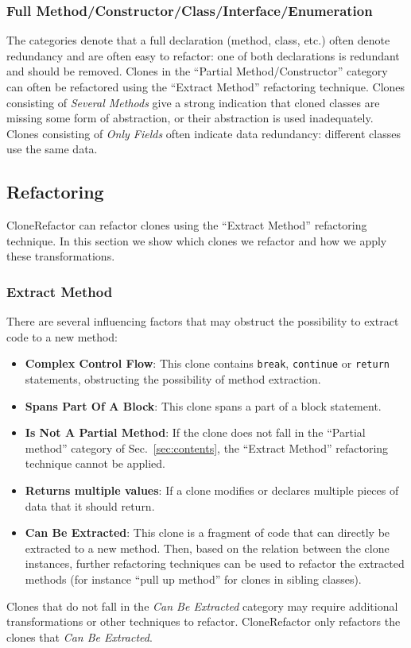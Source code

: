 \documentclass[sigconf,review]{acmart}
\begin{document}
\subsubsection{Full Method/Constructor/Class/Interface/Enumeration}
The categories denote that a full declaration (method, class, etc.) often denote redundancy and are often easy to refactor: one of both declarations is redundant and should be removed. Clones in the ``Partial Method/Constructor'' category can often be refactored using the ``Extract Method'' refactoring technique. Clones consisting of \textit{Several Methods} give a strong indication that cloned classes are missing some form of abstraction, or their abstraction is used inadequately. Clones consisting of \textit{Only Fields} often indicate data redundancy: different classes use the same data.

\subsection{Refactoring}
CloneRefactor can refactor clones using the ``Extract Method'' refactoring technique. In this section we show which clones we refactor and how we apply these transformations.

\subsubsection{Extract Method}
There are several influencing factors that may obstruct the possibility to extract code to a new method:
\begin{itemize}
    \item \textbf{Complex Control Flow}: This clone contains \texttt{break}, \texttt{continue} or \texttt{return} statements, obstructing the possibility of method extraction.
    \item \textbf{Spans Part Of A Block}: This clone spans a part of a block statement.
    \item \textbf{Is Not A Partial Method}: If the clone does not fall in the ``Partial method'' category of Sec.~\ref{sec:contents}, the ``Extract Method'' refactoring technique cannot be applied.
    \item \textbf{Returns multiple values}: If a clone modifies or declares multiple pieces of data that it should return.
    \item \textbf{Can Be Extracted}: This clone is a fragment of code that can directly be extracted to a new method. Then, based on the relation between the clone instances, further refactoring techniques can be used to refactor the extracted methods (for instance ``pull up method'' for clones in sibling classes).
\end{itemize}
Clones that do not fall in the \textit{Can Be Extracted} category may require additional transformations or other techniques to refactor. CloneRefactor only refactors the clones that \textit{Can Be Extracted}.
\end{document}
